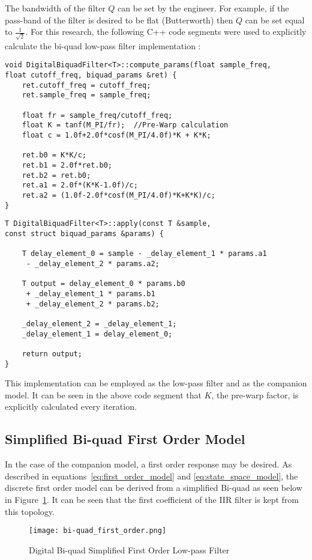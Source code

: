 The bandwidth of the filter $Q$ can be set by the engineer.  For example, if the pass-band of the filter is desired to be flat (Butterworth) then $Q$ can be set equal to $\frac{1}{\sqrt{2}}$.  For this research, the following C++ code segments were used to explicitly calculate the bi-quad low-pass filter implementation \cite{apm_source_code}: \newline

\begin{lstlisting}
void DigitalBiquadFilter<T>::compute_params(float sample_freq, 
float cutoff_freq, biquad_params &ret) {
    ret.cutoff_freq = cutoff_freq;
    ret.sample_freq = sample_freq;

    float fr = sample_freq/cutoff_freq;
    float K = tanf(M_PI/fr);  //Pre-Warp calculation
    float c = 1.0f+2.0f*cosf(M_PI/4.0f)*K + K*K;

    ret.b0 = K*K/c;
    ret.b1 = 2.0f*ret.b0;
    ret.b2 = ret.b0;
    ret.a1 = 2.0f*(K*K-1.0f)/c;
    ret.a2 = (1.0f-2.0f*cosf(M_PI/4.0f)*K+K*K)/c;
}
\end{lstlisting}

\begin{lstlisting}
T DigitalBiquadFilter<T>::apply(const T &sample, 
const struct biquad_params &params) {
    
    T delay_element_0 = sample - _delay_element_1 * params.a1 
     - _delay_element_2 * params.a2;
    
    T output = delay_element_0 * params.b0 
     + _delay_element_1 * params.b1 
     + _delay_element_2 * params.b2;

    _delay_element_2 = _delay_element_1;
    _delay_element_1 = delay_element_0;

    return output;
}

\end{lstlisting}

This implementation can be employed as the \Lone low-pass filter and as the companion model.  It can be seen in the above code segment that $K$, the pre-warp factor, is explicitly calculated every iteration.

\subsection{Simplified Bi-quad First Order Model}

In the case of the companion model, a first order response may be desired.  As described in equations~\ref{eq:first_order_model} and \ref{eq:state_space_model}, the discrete first order model can be derived from a simplified Bi-quad as seen below in Figure~\ref{fig:bi-quad_first_order}.  It can be seen that the first coefficient of the \ac{IIR} filter is kept from this topology.
\begin{figure}[h!]
 \centering
  \texttt{[image: bi-quad\_first\_order.png]}
  \caption{Digital Bi-quad Simplified First Order Low-pass Filter }
  \label{fig:bi-quad_first_order}
\end{figure}


